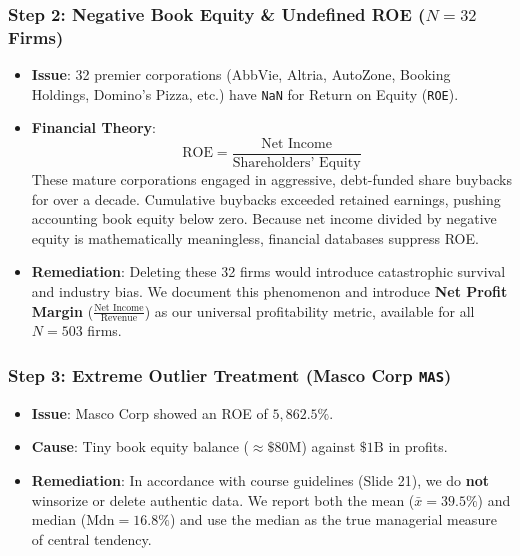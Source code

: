 \documentclass[
]{article}
\providecommand{\tightlist}{%
  \setlength{\itemsep}{0pt}\setlength{\parskip}{0pt}}
\begin{document}
\subsubsection{\texorpdfstring{Step 2: Negative Book Equity \& Undefined
ROE (\(N = 32\)
Firms)}{Step 2: Negative Book Equity \& Undefined ROE (N = 32 Firms)}}\label{step-2-negative-book-equity-undefined-roe-n-32-firms}

\begin{itemize}
\tightlist
\item
  \textbf{Issue}: 32 premier corporations (AbbVie, Altria, AutoZone,
  Booking Holdings, Domino's Pizza, etc.) have \texttt{NaN} for Return
  on Equity (\texttt{ROE}).
\item
  \textbf{Financial Theory}:
  \[\text{ROE} = \frac{\text{Net Income}}{\text{Shareholders' Equity}}\]
  These mature corporations engaged in aggressive, debt-funded share
  buybacks for over a decade. Cumulative buybacks exceeded retained
  earnings, pushing accounting book equity below zero. Because net
  income divided by negative equity is mathematically meaningless,
  financial databases suppress ROE.
\item
  \textbf{Remediation}: Deleting these 32 firms would introduce
  catastrophic survival and industry bias. We document this phenomenon
  and introduce \textbf{Net Profit Margin}
  (\(\frac{\text{Net Income}}{\text{Revenue}}\)) as our universal
  profitability metric, available for all \(N = 503\) firms.
\end{itemize}

\subsubsection{\texorpdfstring{Step 3: Extreme Outlier Treatment (Masco
Corp
\texttt{MAS})}{Step 3: Extreme Outlier Treatment (Masco Corp MAS)}}\label{step-3-extreme-outlier-treatment-masco-corp-mas}

\begin{itemize}
\tightlist
\item
  \textbf{Issue}: Masco Corp showed an ROE of \(5,862.5\%\).
\item
  \textbf{Cause}: Tiny book equity balance (\(\approx \$80\text{M}\))
  against \(\$1\text{B}\) in profits.
\item
  \textbf{Remediation}: In accordance with course guidelines (Slide 21),
  we do \textbf{not} winsorize or delete authentic data. We report both
  the mean (\(\bar{x} = 39.5\%\)) and median (\(\text{Mdn} = 16.8\%\))
  and use the median as the true managerial measure of central tendency.
\end{itemize}
\end{document}
